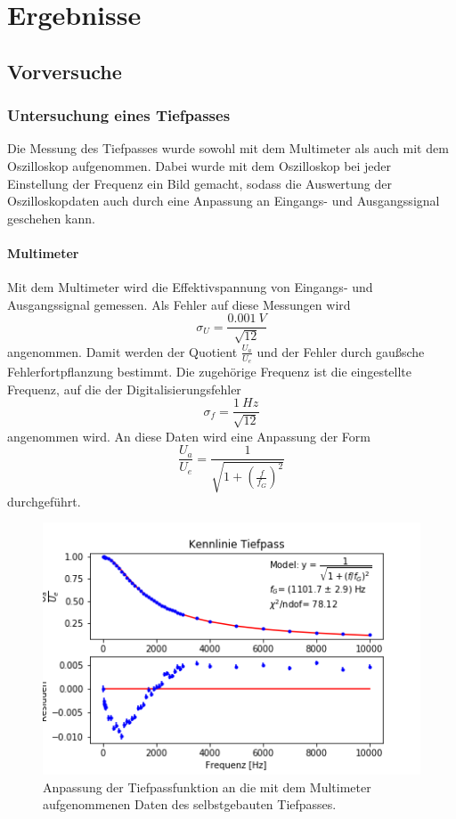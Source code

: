 \documentclass[12pt,a4paper]{article}
\begin{document}
\section{Ergebnisse}
\subsection{Vorversuche}
\subsubsection{Untersuchung eines Tiefpasses}
Die Messung des Tiefpasses wurde sowohl mit dem Multimeter als auch mit dem Oszilloskop aufgenommen. Dabei wurde mit dem Oszilloskop bei jeder Einstellung der Frequenz ein Bild gemacht, sodass die Auswertung der Oszilloskopdaten auch durch eine Anpassung an Eingangs- und Ausgangssignal geschehen kann. 

\paragraph{Multimeter}
Mit dem Multimeter wird die Effektivspannung von Eingangs- und Ausgangssignal gemessen. Als Fehler auf diese Messungen wird 
\begin{equation*}
\sigma _U = \dfrac{\SI{0,001}{V}}{\sqrt{12}}
\end{equation*}
angenommen. Damit werden der Quotient $\frac{U_a}{U_e}$ und der Fehler durch gaußsche Fehlerfortpflanzung bestimmt. Die zugehörige Frequenz ist die eingestellte Frequenz, auf die der Digitalisierungsfehler
\begin{equation*}
\sigma _f = \dfrac{\SI{1}{Hz}}{\sqrt{12}}
\end{equation*}
angenommen wird. An diese Daten wird eine Anpassung der Form 
\begin{equation}
\dfrac{U_a}{U_e} = \dfrac{1}{\sqrt{1 + \left( \frac{f}{f_G} \right)^2}}
\label{eq:TiefpassFunktion}
\end{equation}
durchgeführt. 

\begin{figure}
\centering
\includegraphics[scale=1]{Bilder/Vorversuch1/TiefpassMulti.png}
\caption[test]{Anpassung der Tiefpassfunktion an die mit dem Multimeter aufgenommenen Daten des selbstgebauten Tiefpasses.}
\label{fig:Tiefpass_Multi}
\end{figure}
\end{document}
